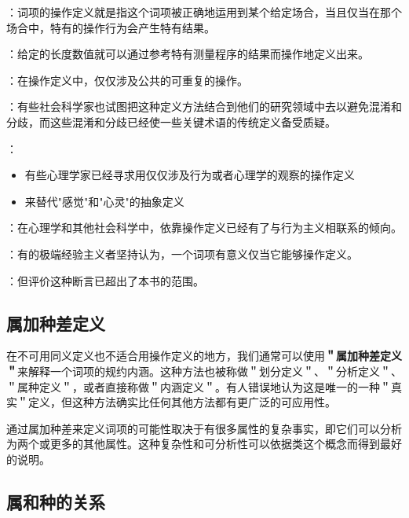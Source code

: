 \begin{theorembox}[title=操作定义的基本原理]
：词项的操作定义就是指这个词项被正确地运用到某个给定场合，当且仅当在那个场合中，特有的操作行为会产生特有结果。

：给定的长度数值就可以通过参考特有测量程序的结果而操作地定义出来。

：在操作定义中，仅仅涉及公共的可重复的操作。
\end{theorembox}

\begin{theorembox}[title=操作定义在社会科学中的应用]
：有些社会科学家也试图把这种定义方法结合到他们的研究领域中去以避免混淆和分歧，而这些混淆和分歧已经使一些关键术语的传统定义备受质疑。

：
\begin{itemize}
  \item 有些心理学家已经寻求用仅仅涉及行为或者心理学的观察的操作定义
  \item 来替代"感觉"和"心灵"的抽象定义
\end{itemize}

：在心理学和其他社会科学中，依靠操作定义已经有了与行为主义相联系的倾向。
\end{theorembox}

\begin{theorembox}[title=极端经验主义的主张]
：有的极端经验主义者坚持认为，一个词项有意义仅当它能够操作定义。

：但评价这种断言已超出了本书的范围。
\end{theorembox}

\subsection{属加种差定义}

在不可用同义定义也不适合用操作定义的地方，我们通常可以使用\textbf{＂属加种差定义＂}来解释一个词项的规约内涵。这种方法也被称做＂划分定义＂、＂分析定义＂、＂属种定义＂，或者直接称做＂内涵定义＂。有人错误地认为这是唯一的一种＂真实＂定义，但这种方法确实比任何其他方法都有更广泛的可应用性。

通过属加种差来定义词项的可能性取决于有很多属性的复杂事实，即它们可以分析为两个或更多的其他属性。这种复杂性和可分析性可以依据类这个概念而得到最好的说明。

\subsection{属和种的关系}

